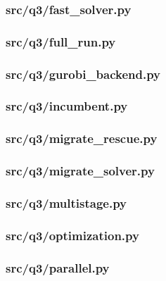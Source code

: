 \documentclass[zihao=-4,a4paper,UTF8,fontset=none]{ctexart}
\begin{document}
\subsubsection*{src/q3/fast\_solver.py}


\subsubsection*{src/q3/full\_run.py}


\subsubsection*{src/q3/gurobi\_backend.py}


\subsubsection*{src/q3/incumbent.py}


\subsubsection*{src/q3/migrate\_rescue.py}


\subsubsection*{src/q3/migrate\_solver.py}


\subsubsection*{src/q3/multistage.py}


\subsubsection*{src/q3/optimization.py}


\subsubsection*{src/q3/parallel.py}

\end{document}
